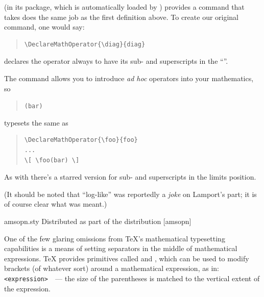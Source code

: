\AMSLaTeX{} (in its  package, which is automatically
loaded by ) provides a command
 that takes does the same job as the first
definition above.  To create our original  command, one would
say:
\begin{quote}
\begin{verbatim}
\DeclareMathOperator{\diag}{diag}
\end{verbatim}
\end{quote}
 declares the operator always to have its
sub- and superscripts in the %
``''.

The  command  allows you to
introduce \emph{ad hoc} operators into your mathematics, so
\begin{quote}
  \csx{[} \texttt{(bar)} \csx{]}
\end{quote}
typesets the same as
\begin{quote}
\begin{verbatim}
\DeclareMathOperator{\foo}{foo}
...
\[ \foo(bar) \]
\end{verbatim}
\end{quote}
As with  there's a starred version
 for sub- and superscripts in the limits position.

(It should be noted that ``log-like'' was reportedly a \emph{joke} on
Lamport's part; it is of course clear what was meant.)
\begin{ctanrefs}
\item[amsopn.sty]Distributed as part of the \AMSLaTeX{} distribution
  [amsopn]
\end{ctanrefs}


One of the few glaring omissions from \TeX{}'s mathematical
typesetting capabilities is a means of setting separators in the
middle of mathematical expressions.  \TeX{} provides primitives called
 and , which can be used to modify brackets (of
whatever sort) around a mathematical expression, as in:
\texttt{ <expression> }~--- the size of the
parentheses is matched to the vertical extent of the expression.

